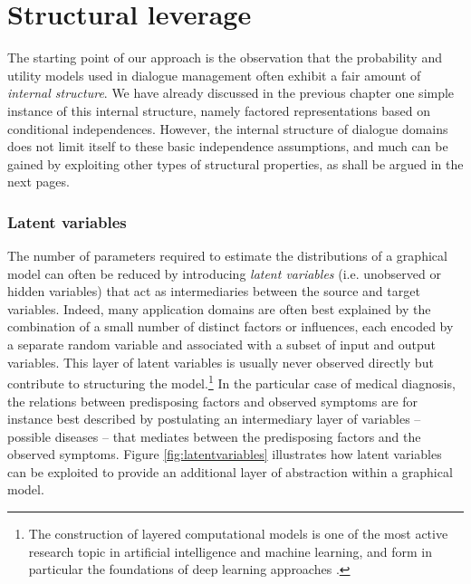 \section{Structural leverage}
\label{sec:rmotivation}

The starting point of our approach is the observation that the probability and utility models used in dialogue management often exhibit a fair amount of \textit{internal structure}.  
We have already discussed in the previous chapter one simple instance of this internal structure, namely factored representations based on conditional independences. However, the internal structure of dialogue domains does not limit itself to these basic independence assumptions, and much can be gained by exploiting other types of structural properties, as shall be argued in the next pages. 



\subsubsection*{Latent variables}
 
The number of parameters required to estimate the distributions of a graphical model can often be reduced by introducing \textit{latent variables} (i.e. unobserved or hidden variables) that act as intermediaries between the source and target variables. Indeed, many application domains are often best explained by the combination of a small number of distinct factors or influences, each encoded by a separate random variable and associated with a subset of input and output variables. This layer of latent variables is usually never observed directly but contribute to structuring the model.\footnote{The construction of layered computational models is one of the most active research topic in artificial intelligence and machine learning, and form in particular the foundations of deep learning approaches \citep{Bengio:2009}.} In the particular case of medical diagnosis, the relations between predisposing factors and observed symptoms are for instance best described by postulating an intermediary layer of variables -- possible diseases -- that mediates between the predisposing factors and the observed symptoms.  Figure \ref{fig:latentvariables} illustrates how latent variables can be exploited to provide an additional layer of abstraction within a graphical model.

